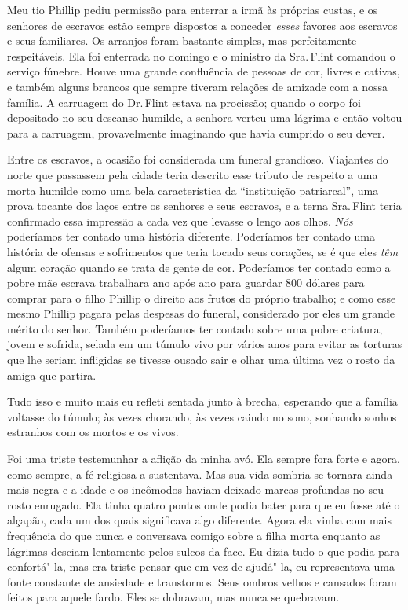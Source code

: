 Meu tio Phillip pediu permissão para
enterrar a irmã às próprias custas, e os senhores de escravos estão
sempre dispostos a conceder \emph{esses} favores aos escravos e seus
familiares. Os arranjos foram bastante simples, mas perfeitamente
respeitáveis. Ela foi enterrada no domingo e o ministro da Sra.\,Flint
comandou o serviço fúnebre. Houve uma grande confluência de pessoas de
cor, livres e cativas, e também alguns brancos que sempre tiveram
relações de amizade com a nossa família. A carruagem do Dr.\,Flint estava
na procissão; quando o corpo foi depositado no seu descanso humilde, a
senhora verteu uma lágrima e então voltou para a carruagem,
provavelmente imaginando que havia cumprido o seu dever.

Entre os escravos, a ocasião foi
considerada um funeral grandioso. Viajantes do norte que passassem pela
cidade teria descrito esse tributo de respeito a uma morta humilde como
uma bela característica da ``instituição patriarcal'', uma prova tocante
dos laços entre os senhores e seus escravos, e a terna Sra.\,Flint teria
confirmado essa impressão a cada vez que levasse o lenço aos olhos.
\emph{Nós} poderíamos ter contado uma história diferente. Poderíamos ter
contado uma história de ofensas e sofrimentos que teria tocado seus
corações, se é que eles \emph{têm} algum coração quando se trata de
gente de cor. Poderíamos ter contado como a pobre mãe escrava trabalhara
ano após ano para guardar 800 dólares para comprar para o filho Phillip
o direito aos frutos do próprio trabalho; e como esse mesmo Phillip
pagara pelas despesas do funeral, considerado por eles um grande mérito
do senhor. Também poderíamos ter contado sobre uma pobre criatura, jovem
e sofrida, selada em um túmulo vivo por vários anos para evitar as
torturas que lhe seriam infligidas se tivesse ousado sair e olhar uma
última vez o rosto da amiga que partira.

Tudo isso e muito mais eu refleti
sentada junto à brecha, esperando que a família voltasse do túmulo; às
vezes chorando, às vezes caindo no sono, sonhando sonhos estranhos com
os mortos e os vivos.

Foi uma triste testemunhar a aflição da
minha avó. Ela sempre fora forte e agora, como sempre, a fé religiosa a
sustentava. Mas sua vida sombria se tornara ainda mais negra e a idade e
os incômodos haviam deixado marcas profundas no seu rosto enrugado. Ela
tinha quatro pontos onde podia bater para que eu fosse até o alçapão,
cada um dos quais significava algo diferente. Agora ela vinha com mais
frequência do que nunca e conversava comigo sobre a filha morta enquanto
as lágrimas desciam lentamente pelos sulcos da face. Eu dizia tudo o que
podia para confortá"-la, mas era triste pensar que em vez de ajudá"-la, eu
representava uma fonte constante de ansiedade e transtornos. Seus ombros
velhos e cansados foram feitos para aquele fardo. Eles se dobravam, mas
nunca se quebravam.

